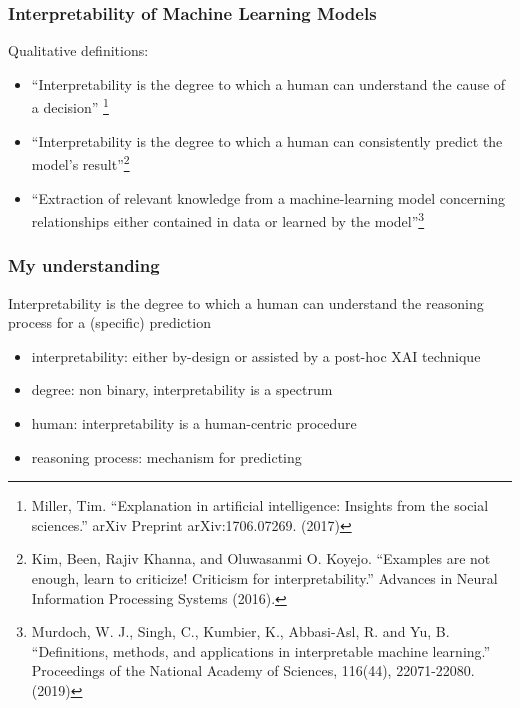 \begin{frame}
  \frametitle{Interpretability of Machine Learning Models}
  Qualitative definitions:
  \begin{itemize}
  \item<1-> ``Interpretability is the degree to which a human can understand the
    cause of a decision'' \footnote{Miller, Tim. ``Explanation in artificial
    intelligence: Insights from the social sciences.'' arXiv Preprint
    arXiv:1706.07269. (2017)}
  \item<2-> ``Interpretability is the degree to which a human can consistently
    predict the model’s result''\footnote{Kim, Been, Rajiv Khanna, and
    Oluwasanmi O. Koyejo. ``Examples are not enough, learn to criticize!
    Criticism for interpretability.'' Advances in Neural Information Processing
    Systems (2016).}
  \item<3-> ``Extraction of relevant knowledge from a machine-learning model
    concerning relationships either contained in data or learned by the
    model''\footnote{Murdoch, W. J., Singh, C., Kumbier, K., Abbasi-Asl, R. and
    Yu, B. ``Definitions, methods, and applications in interpretable machine
    learning.'' Proceedings of the National Academy of Sciences, 116(44),
    22071-22080. (2019)}
  \end{itemize}
\end{frame}

\begin{frame}
  \frametitle{My understanding}
  Interpretability is the degree to which a human can understand the reasoning process for a (specific) prediction

  \begin{itemize}
    \item interpretability: either by-design or assisted by a post-hoc XAI technique
    \item degree: non binary, interpretability is a spectrum
    \item human: interpretability is a human-centric procedure
    \item reasoning process: mechanism for predicting
  \end{itemize}
  \end{frame}

